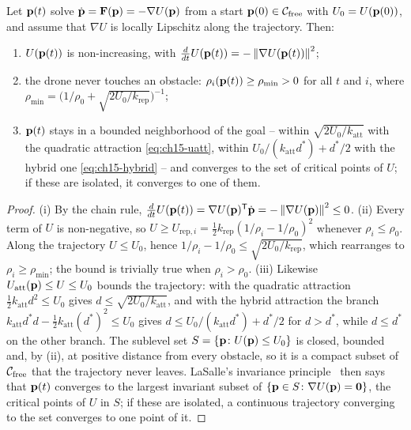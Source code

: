 \begin{theorem}
\label{thm:ch15-descent}
Let $\mathbf{p}(t)$ solve $\dot{\mathbf{p}} = \mathbf{F}(\mathbf{p}) = -\nabla U(\mathbf{p})$ from a
start $\mathbf{p}(0) \in \mathcal{C}_{\mathrm{free}}$ with $U_0 = U(\mathbf{p}(0))$, and assume that $\nabla U$
is locally Lipschitz along the trajectory. Then:
\begin{enumerate}[label=(\roman*)]
  \item $U(\mathbf{p}(t))$ is non-increasing, with $\frac{d}{dt} U(\mathbf{p}(t)) = -\left\lVert \nabla U(\mathbf{p}(t)) \right\rVert^2$;
  \item the drone never touches an obstacle: $\rho_i(\mathbf{p}(t)) \ge \rho_{\min} > 0$ for all $t$ and $i$, where
        $\rho_{\min} = \bigl(1/\rho_0 + \sqrt{2U_0/k_{\mathrm{rep}}}\bigr)^{-1}$;
  \item $\mathbf{p}(t)$ stays in a bounded neighborhood of the goal -- within
        $\sqrt{2U_0/k_{\mathrm{att}}}$ with the quadratic attraction
        \cref{eq:ch15-uatt}, within $U_0/(k_{\mathrm{att}} d^*) + d^*/2$ with the
        hybrid one \cref{eq:ch15-hybrid} -- and converges to the set of
        critical points of $U$; if these are isolated, it converges to one of them.
\end{enumerate}
\end{theorem}
\begin{proof}
(i) By the chain rule, $\frac{d}{dt}U(\mathbf{p}(t)) = \nabla U(\mathbf{p})^{\mathsf{T}} \dot{\mathbf{p}}
= -\left\lVert \nabla U(\mathbf{p}) \right\rVert^2 \le 0$.
(ii) Every term of $U$ is non-negative, so $U \ge U_{\mathrm{rep},i} =
\tfrac12 k_{\mathrm{rep}} (1/\rho_i - 1/\rho_0)^2$ whenever $\rho_i \le
\rho_0$. Along the trajectory $U \le U_0$, hence $1/\rho_i - 1/\rho_0 \le
\sqrt{2U_0/k_{\mathrm{rep}}}$, which rearranges to $\rho_i \ge \rho_{\min}$;
the bound is trivially true when $\rho_i > \rho_0$.
(iii) Likewise $U_{\mathrm{att}}(\mathbf{p}) \le U \le U_0$ bounds the trajectory:
with the quadratic attraction $\tfrac12 k_{\mathrm{att}} d^2 \le U_0$ gives
$d \le \sqrt{2U_0/k_{\mathrm{att}}}$, and with the hybrid attraction the branch
$k_{\mathrm{att}} d^* d - \tfrac12 k_{\mathrm{att}} (d^*)^2 \le U_0$ gives
$d \le U_0/(k_{\mathrm{att}} d^*) + d^*/2$ for $d > d^*$, while $d \le d^*$ on the
other branch. The sublevel set $S = \left\{ \mathbf{p} \colon
U(\mathbf{p}) \le U_0 \right\}$ is closed, bounded and, by (ii), at positive distance
from every obstacle, so it is a compact subset of $\mathcal{C}_{\mathrm{free}}$ that the
trajectory never leaves. LaSalle's invariance principle~\cite{khalil2002nonlinear}
then says that $\mathbf{p}(t)$ converges to the largest invariant subset of
$\left\{ \mathbf{p} \in S \colon \nabla U(\mathbf{p}) = \mathbf{0} \right\}$, the critical points of
$U$ in $S$; if these are isolated, a continuous trajectory converging to
the set converges to one point of it.
\end{proof}


